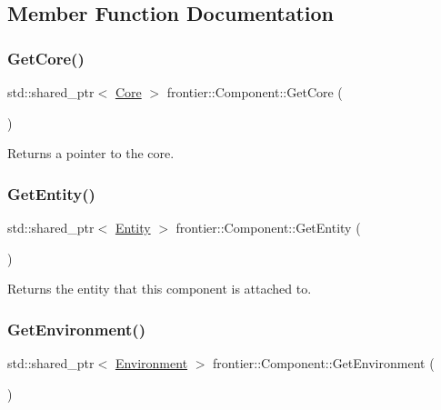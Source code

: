\subsection{Member Function Documentation}
\mbox{\label{classfrontier_1_1_component_a0006685ddaadb379360f7f28294d3806}} 
\subsubsection{\texorpdfstring{Get\+Core()}{GetCore()}}
{\footnotesize\ttfamily std\+::shared\+\_\+ptr$<$ \hyperlink{classfrontier_1_1_core}{Core} $>$ frontier\+::\+Component\+::\+Get\+Core (\begin{DoxyParamCaption}{ }\end{DoxyParamCaption})\hspace{0.3cm}{\ttfamily [protected]}}



Returns a pointer to the core. 

\mbox{\label{classfrontier_1_1_component_a4d4193dbf06629b5e457fb8f7d460e49}} 
\subsubsection{\texorpdfstring{Get\+Entity()}{GetEntity()}}
{\footnotesize\ttfamily std\+::shared\+\_\+ptr$<$ \hyperlink{classfrontier_1_1_entity}{Entity} $>$ frontier\+::\+Component\+::\+Get\+Entity (\begin{DoxyParamCaption}{ }\end{DoxyParamCaption})}



Returns the entity that this component is attached to. 

\mbox{\label{classfrontier_1_1_component_a24846c0ac8d4d607aff483ed7ffdf5f8}} 
\subsubsection{\texorpdfstring{Get\+Environment()}{GetEnvironment()}}
{\footnotesize\ttfamily std\+::shared\+\_\+ptr$<$ \hyperlink{classfrontier_1_1_environment}{Environment} $>$ frontier\+::\+Component\+::\+Get\+Environment (\begin{DoxyParamCaption}{ }\end{DoxyParamCaption})\hspace{0.3cm}{\ttfamily [protected]}}



